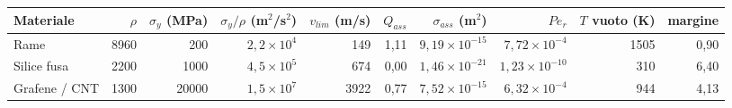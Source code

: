 \begin{tabular}{lrrrrrrrrr}
\hline
Materiale & $\rho$ & $\sigma_y$ (MPa) & $\sigma_y/\rho$ (m$^2$/s$^2$) & $v_{lim}$ (m/s) & $Q_{ass}$ & $\sigma_{ass}$ (m$^2$) & $Pe_r$ & $T$ vuoto (K) & margine \\
\hline
Rame & 8960 & 200 & $2{,}2\times10^{4}$ & 149 & 1{,}11 & $9{,}19\times10^{-15}$ & $7{,}72\times10^{-4}$ & 1505 & 0{,}90 \\
Silice fusa & 2200 & 1000 & $4{,}5\times10^{5}$ & 674 & 0{,}00 & $1{,}46\times10^{-21}$ & $1{,}23\times10^{-10}$ & 310 & 6{,}40 \\
Grafene / CNT & 1300 & 20000 & $1{,}5\times10^{7}$ & 3922 & 0{,}77 & $7{,}52\times10^{-15}$ & $6{,}32\times10^{-4}$ & 944 & 4{,}13 \\
\hline
\end{tabular}
